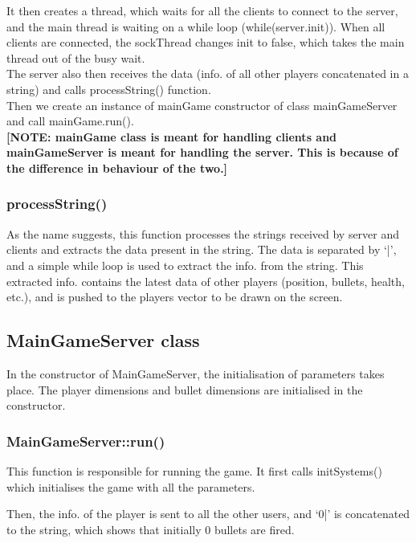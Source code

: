 \documentclass{article}
\begin{document}
It then creates a thread, which waits for all the clients to connect to the server, and the main thread is waiting on a while loop (while(server.init)). When all clients are connected, the sockThread changes init to false, which takes the main thread out of the busy wait. \\

The server also then receives the data (info. of all other players concatenated in a string) and calls processString() function. \\

Then we create an instance of mainGame constructor of class mainGameServer and call mainGame.run(). \\


\textbf{[NOTE: mainGame class is meant for handling clients and mainGameServer is meant for handling the server. This is because of the difference in behaviour of the two.]} \\


\subsubsection{processString()} As the name suggests, this function processes the strings received by server and clients and extracts the data present in the string. The data is separated by ‘|’, and a simple while loop is used to extract the info. from the string. This extracted info. contains the latest data of other players (position, bullets, health, etc.), and is pushed to the players vector to be drawn on the screen. \\


\subsection{MainGameServer class}
In the constructor of MainGameServer, the initialisation of parameters takes place. The player dimensions and bullet dimensions are initialised in the constructor.
\newline

\subsubsection{MainGameServer::run()}
This function is responsible for running the game. It first calls initSystems() which initialises the game with all the parameters.

Then, the info. of the player is sent to all the other users, and ‘0|’ is concatenated to the string, which shows that initially 0 bullets are fired. 
\end{document}
